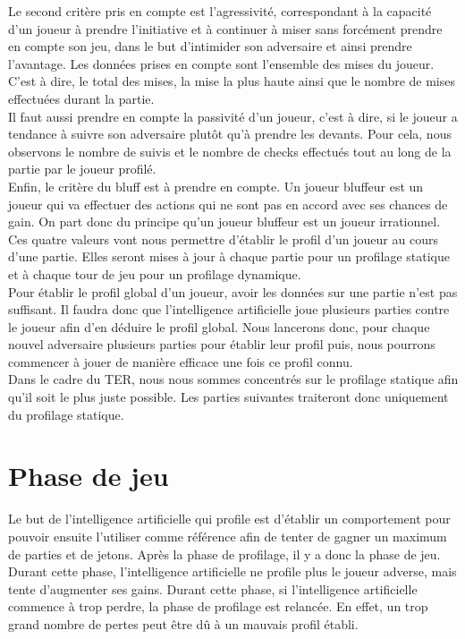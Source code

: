 \documentclass{report}
\begin{document}
Le second critère pris en compte est l'agressivité, correspondant à la capacité d'un joueur à prendre l'initiative et à continuer à miser sans forcément prendre en compte son jeu, dans le but d'intimider son adversaire et ainsi prendre l'avantage. Les données prises en compte sont l'ensemble des mises du joueur. C'est à dire, le total des mises, la mise la plus haute ainsi que le nombre de mises effectuées durant la partie. \\

Il faut aussi prendre en compte la passivité d'un joueur, c'est à dire, si le joueur a tendance à suivre son adversaire plutôt qu'à prendre les devants. Pour cela, nous observons le nombre de suivis et le nombre de checks effectués tout au long de la partie par le joueur profilé.\\

Enfin, le critère du bluff est à prendre en compte. Un joueur bluffeur est un joueur qui va effectuer des actions qui ne sont pas en accord avec ses chances de gain. On part donc du principe qu'un joueur bluffeur est un joueur irrationnel.\\

Ces quatre valeurs vont nous permettre d'établir le profil d'un joueur au cours d'une partie. Elles seront mises à jour à chaque partie pour un profilage statique et à chaque tour de jeu pour un profilage dynamique. \\

Pour établir le profil global d'un joueur, avoir les données sur une partie n'est pas suffisant. Il faudra donc que l'intelligence artificielle joue plusieurs parties contre le joueur afin d'en déduire le profil global. Nous lancerons donc, pour chaque nouvel adversaire plusieurs parties pour établir leur profil puis, nous pourrons commencer à jouer de manière efficace une fois ce profil connu.\\

Dans le cadre du TER, nous nous sommes concentrés sur le profilage statique afin qu'il soit le plus juste possible. Les parties suivantes traiteront donc uniquement du profilage statique. \par


\section{Phase de jeu}

\hspace{0.5cm}Le but de l'intelligence artificielle qui profile est d'établir un comportement pour pouvoir ensuite l'utiliser comme référence afin de tenter de gagner un maximum de parties et de jetons. Après la phase de profilage, il y a donc la phase de jeu. Durant cette phase, l'intelligence artificielle ne profile plus le joueur adverse, mais tente d'augmenter ses gains. Durant cette phase, si l'intelligence artificielle commence à trop perdre, la phase de profilage est relancée. En effet, un trop grand nombre de pertes peut être dû à un mauvais profil établi. \\
\end{document}
